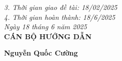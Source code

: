     \textit{3. Thời gian giao đề tài: 18/02/2025} \\[0.2cm]

    \textit{4. Thời gian hoàn thành: 18/6/2025} \\[0.2cm]

\vspace{6pt}
\hspace{7cm}\textit{Ngày 18 tháng 6 năm 2025}\\
\vspace{2pt}
\hspace{8.5cm}\textbf{CÁN BỘ HƯỚNG DẪN} \\

\vspace{36pt}

\hspace{8cm}\textbf{Nguyễn Quốc Cường}
